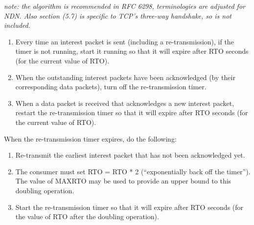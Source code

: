 \documentclass[10pt]{article}
\begin{document}
\emph{note: the algorithm is recommended in RFC 6298, terminologies
  are adjusted for NDN. Also section (5.7) is specific to TCP's
  three-way handshake, so is not included.}
\begin{mdframed}
  \begin{enumerate}
  \item Every time an interest packet is sent (including a
    re-transmission), if the timer is not running, start it running so
    that it will expire after RTO seconds (for the current value of
    RTO).
  \item When the outstanding interest packets have been acknowledged
    (by their corresponding data packets), turn off the
    re-transmission timer.
  \item When a data packet is received that acknowledges a new interest
    packet, restart the re-transmission timer so that it will expire
    after RTO seconds (for the current value of RTO).\\
  \end{enumerate}

  When the re-transmission timer expires, do the following:
  \begin{enumerate}
  \item Re-transmit the earliest interest packet that has not been
    acknowledged yet.
  \item The consumer must set RTO = RTO * 2 (``exponentially back off
    the timer''). The value of MAXRTO may be used to provide an upper
    bound to this doubling operation.
  \item Start the re-transmission timer so that it will expire
    after RTO seconds (for the value of RTO after the doubling
    operation).
  \end{enumerate}
\end{mdframed}

\vspace{2em}
\end{document}
